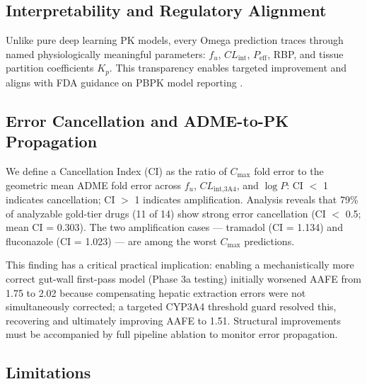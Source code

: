 \documentclass[review,3p]{elsarticle}
\begin{document}
\subsection{Interpretability and Regulatory Alignment}
\label{sec:interpretability}

Unlike pure deep learning PK models, every Omega prediction traces through named physiologically meaningful parameters: $f_u$, $CL_{\text{int}}$, $P_{\text{eff}}$, RBP, and tissue partition coefficients $K_p$. This transparency enables targeted improvement and aligns with FDA guidance on PBPK model reporting \cite{fda2018pbpk}.

\subsection{Error Cancellation and ADME-to-PK Propagation}
\label{sec:error-cancellation}

We define a Cancellation Index (CI) as the ratio of $C_{\max}$ fold error to the geometric mean ADME fold error across $f_u$, $CL_{\text{int,3A4}}$, and $\log P$: CI $<$ 1 indicates cancellation; CI $>$ 1 indicates amplification. Analysis reveals that 79\% of analyzable gold-tier drugs (11 of 14) show strong error cancellation (CI $<$ 0.5; mean CI = 0.303). The two amplification cases --- tramadol (CI = 1.134) and fluconazole (CI = 1.023) --- are among the worst $C_{\max}$ predictions.

This finding has a critical practical implication: enabling a mechanistically more correct gut-wall first-pass model (Phase 3a testing) initially worsened AAFE from 1.75 to 2.02 because compensating hepatic extraction errors were not simultaneously corrected; a targeted CYP3A4 threshold guard resolved this, recovering and ultimately improving AAFE to 1.51. Structural improvements must be accompanied by full pipeline ablation to monitor error propagation.

\subsection{Limitations}
\label{sec:limitations}
\end{document}
